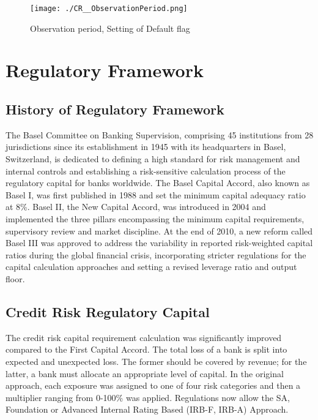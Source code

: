 \begin{figure}[H]
	\centering
	\texttt{[image: ./CR\_\_ObservationPeriod.png]}
    \caption{Observation period, Setting of Default flag}
    \label{fig:cr_timeperiod}
\end{figure}

\section{Regulatory Framework}

\subsection{History of Regulatory Framework}

The Basel Committee on Banking Supervision, comprising 45 institutions from 28 jurisdictions since its establishment in 1945 with its headquarters in Basel, Switzerland, is dedicated to defining a high standard for risk management and internal controls and establishing a risk-sensitive calculation process of the regulatory capital for banks worldwide. The Basel Capital Accord, also known as Basel I, was first published in 1988 and set the minimum capital adequacy ratio at 8\%. Basel II, the New Capital Accord, was introduced in 2004 and implemented the three pillars encompassing the minimum capital requirements, supervisory review and market discipline. At the end of 2010, a new reform called Basel III was approved to address the variability in reported risk-weighted capital ratios during the global financial crisis, incorporating stricter regulations for the capital calculation approaches and setting a revised leverage ratio and output floor. \cite{BCBS:2023}

\subsection{Credit Risk Regulatory Capital}

The credit risk capital requirement calculation was significantly improved compared to the First Capital Accord. The total loss of a bank is split into expected and unexpected loss. The former should be covered by revenue; for the latter, a bank must allocate an appropriate level of capital. In the original approach, each exposure was assigned to one of four risk categories and then a multiplier ranging from 0-100\% was applied. Regulations now allow the \ac{SA}, Foundation or Advanced Internal Rating Based (IRB-F, IRB-A) Approach. 

